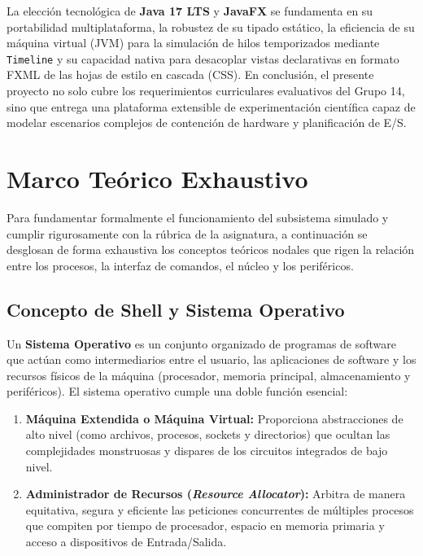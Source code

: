 \documentclass[11pt,letterpaper]{article}
\begin{document}
La elección tecnológica de \textbf{Java 17 LTS} y \textbf{JavaFX} se fundamenta en su portabilidad multiplataforma, la robustez de su tipado estático, la eficiencia de su máquina virtual (JVM) para la simulación de hilos temporizados mediante \texttt{Timeline} y su capacidad nativa para desacoplar vistas declarativas en formato FXML de las hojas de estilo en cascada (CSS). En conclusión, el presente proyecto no solo cubre los requerimientos curriculares evaluativos del Grupo 14, sino que entrega una plataforma extensible de experimentación científica capaz de modelar escenarios complejos de contención de hardware y planificación de E/S.

\section{Marco Teórico Exhaustivo}

Para fundamentar formalmente el funcionamiento del subsistema simulado y cumplir rigurosamente con la rúbrica de la asignatura, a continuación se desglosan de forma exhaustiva los conceptos teóricos nodales que rigen la relación entre los procesos, la interfaz de comandos, el núcleo y los periféricos.

\subsection{Concepto de Shell y Sistema Operativo}

Un \textbf{Sistema Operativo} es un conjunto organizado de programas de software que actúan como intermediarios entre el usuario, las aplicaciones de software y los recursos físicos de la máquina (procesador, memoria principal, almacenamiento y periféricos). El sistema operativo cumple una doble función esencial:
\begin{enumerate}
    \item \textbf{Máquina Extendida o Máquina Virtual:} Proporciona abstracciones de alto nivel (como archivos, procesos, sockets y directorios) que ocultan las complejidades monstruosas y dispares de los circuitos integrados de bajo nivel.
    \item \textbf{Administrador de Recursos (\textit{Resource Allocator}):} Arbitra de manera equitativa, segura y eficiente las peticiones concurrentes de múltiples procesos que compiten por tiempo de procesador, espacio en memoria primaria y acceso a dispositivos de Entrada/Salida.
\end{enumerate}
\end{document}
